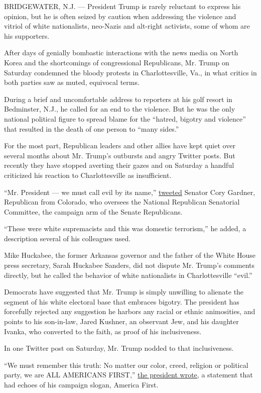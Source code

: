 BRIDGEWATER, N.J. --- President Trump is rarely reluctant to express his
opinion, but he is often seized by caution when addressing the violence
and vitriol of white nationalists, neo-Nazis and alt-right activists,
some of whom are his supporters.

After days of genially bombastic interactions with the news media on
North Korea and the shortcomings of congressional Republicans, Mr. Trump
on Saturday condemned the bloody protests in Charlottesville, Va., in
what critics in both parties saw as muted, equivocal terms.

During a brief and uncomfortable address to reporters at his golf resort
in Bedminster, N.J., he called for an end to the violence. But he was
the only national political figure to spread blame for the ``hatred,
bigotry and violence'' that resulted in the death of one person to
``many sides.''

For the most part, Republican leaders and other allies have kept quiet
over several months about Mr. Trump's outbursts and angry Twitter posts.
But recently they have stopped averting their gazes and on Saturday a
handful criticized his reaction to Charlottesville as insufficient.

``Mr. President --- we must call evil by its name,''
\href{https://twitter.com/SenCoryGardner/status/896472477844385792}{tweeted}
Senator Cory Gardner, Republican from Colorado, who oversees the
National Republican Senatorial Committee, the campaign arm of the Senate
Republicans.

``These were white supremacists and this was domestic terrorism,'' he
added, a description several of his colleagues used.

Mike Huckabee, the former Arkansas governor and the father of the White
House press secretary, Sarah Huckabee Sanders, did not dispute Mr.
Trump's comments directly, but he called the behavior of white
nationalists in Charlottesville ``evil.''

Democrats have suggested that Mr. Trump is simply unwilling to alienate
the segment of his white electoral base that embraces bigotry. The
president has forcefully rejected any suggestion he harbors any racial
or ethnic animosities, and points to his son-in-law, Jared Kushner, an
observant Jew, and his daughter Ivanka, who converted to the faith, as
proof of his inclusiveness.

In one Twitter post on Saturday, Mr. Trump nodded to that inclusiveness.

``We must remember this truth: No matter our color, creed, religion or
political party, we are ALL AMERICANS FIRST,''
\href{https://twitter.com/realDonaldTrump/status/896481262776360960}{the
president wrote}, a statement that had echoes of his campaign slogan,
America First.

